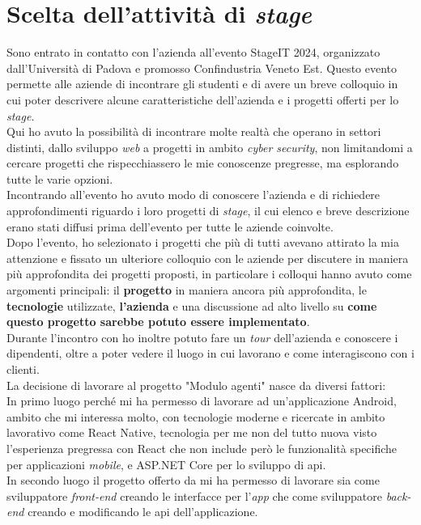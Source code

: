 \section{Scelta dell'attività di \textit{stage}}
Sono entrato in contatto con l'azienda all'evento StageIT 2024, organizzato dall'Università di Padova e promosso Confindustria 
Veneto Est. Questo evento permette alle aziende di incontrare gli studenti e di avere un breve colloquio in cui poter 
descrivere alcune caratteristiche dell'azienda e i progetti offerti per lo \textit{stage}.\\
Qui ho avuto la possibilità di incontrare molte realtà che operano in settori distinti, dallo sviluppo \textit{web} a progetti in 
ambito \textit{cyber security}, non limitandomi a cercare progetti che rispecchiassero le mie conoscenze pregresse, ma esplorando tutte le 
varie opzioni.\\
Incontrando {\company} all'evento ho avuto modo di conoscere l'azienda e di richiedere approfondimenti riguardo i loro progetti di 
\textit{stage}, il cui elenco e breve descrizione erano stati diffusi prima dell'evento per tutte le aziende coinvolte.\\
Dopo l'evento, ho selezionato i progetti che più di tutti avevano attirato la mia attenzione e fissato un ulteriore colloquio con 
le aziende per discutere in maniera più approfondita dei progetti proposti, in particolare i colloqui hanno avuto come argomenti 
principali: il \textbf{progetto} in maniera ancora più approfondita, le \textbf{tecnologie} utilizzate, \textbf{l'azienda} e una discussione ad alto livello 
su \textbf{come questo progetto sarebbe potuto essere implementato}.\\
Durante l'incontro con {\company} ho inoltre potuto fare un \textit{tour} dell'azienda e conoscere i dipendenti, oltre a poter 
vedere il luogo in cui lavorano e come interagiscono con i clienti.\\
La decisione di lavorare al progetto "Modulo agenti" nasce da diversi fattori:\\
In primo luogo perché mi ha permesso di lavorare ad un'applicazione Android, ambito che mi interessa molto, con tecnologie 
moderne e ricercate in ambito lavorativo come React Native, tecnologia per me non del tutto nuova visto l'esperienza 
pregressa con React che non include però le funzionalità specifiche per applicazioni \textit{mobile}, e ASP.NET Core per 
lo sviluppo di \gls{api}.\\
In secondo luogo il progetto offerto da {\company} mi ha permesso di lavorare sia come sviluppatore \textit{front-end} 
creando le interfacce per l'\textit{app} che come sviluppatore \textit{back-end} creando e modificando le \gls{api} dell'applicazione. 
